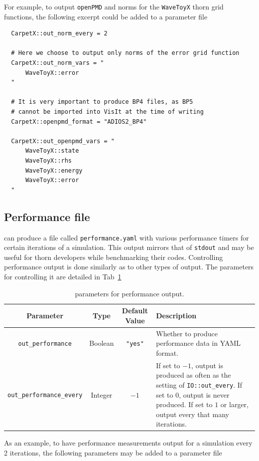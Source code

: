 For example, to output \texttt{openPMD} and norms for the \texttt{WaveToyX} thorn grid functions, the following excerpt could be added to a parameter file

\begin{verbatim}
  CarpetX::out_norm_every = 2
  
  # Here we choose to output only norms of the error grid function    
  CarpetX::out_norm_vars = "
      WaveToyX::error
  "

  # It is very important to produce BP4 files, as BP5
  # cannot be imported into VisIt at the time of writing
  CarpetX::openpmd_format = "ADIOS2_BP4"
  
  CarpetX::out_openpmd_vars = "
      WaveToyX::state
      WaveToyX::rhs
      WaveToyX::energy
      WaveToyX::error
  "
\end{verbatim}

\subsection{Performance file}

\CarpetX\space can produce a file called \texttt{performance.yaml} with various performance timers for certain iterations of a simulation. This output mirrors that of \texttt{stdout} and may be useful for thorn developers while benchmarking their codes. Controlling performance output is done similarly as to other types of output. The parameters for controlling it are detailed in Tab~\ref{tab:perf_output}

\begin{table}[ht]
  \centering
  \begin{tabular*}{\textwidth}{cccp{20em}}
    Parameter                       & Type     & Default Value  & Description \\\hline\hline
    \texttt{out\_performance}        & Boolean & \texttt{"yes"} & Whether to produce performance data in YAML format. \\
    \texttt{out\_performance\_every} & Integer & $-1$           & If set to $-1$, output is produced as often as the setting of \texttt{IO::out\_every}. If set to $0$, output is never produced. If set to $1$ or larger, output every that many iterations. \\\hline\hline
  \end{tabular*}
  \label{tab:perf_output}
  \caption{\CarpetX\space parameters for performance output.}
\end{table}

As an example, to  have performance measurements output for a simulation every 2 iterations, the following parameters may be added to a parameter file

